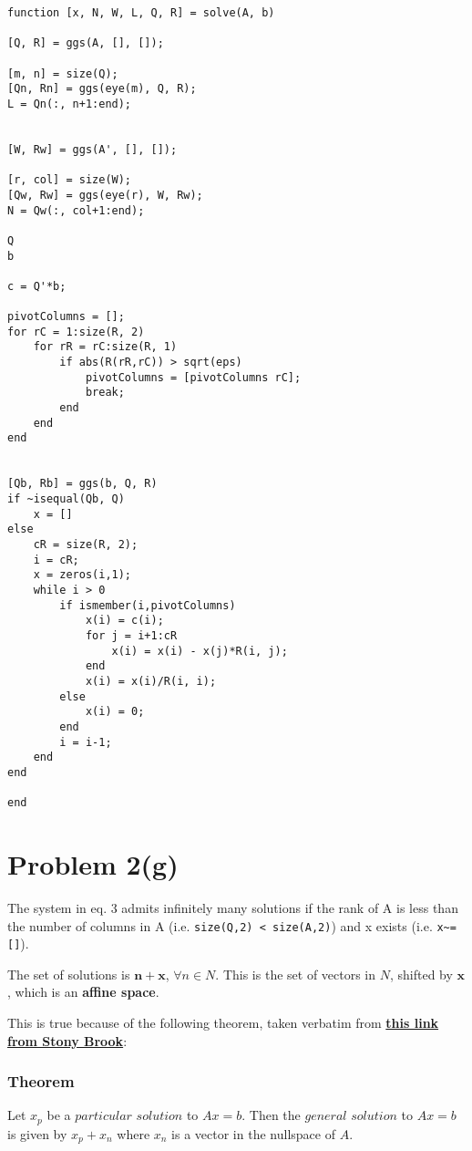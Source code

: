 \documentclass{article}
\begin{document}
\begin{verbatim}
function [x, N, W, L, Q, R] = solve(A, b)

[Q, R] = ggs(A, [], []);

[m, n] = size(Q);
[Qn, Rn] = ggs(eye(m), Q, R);
L = Qn(:, n+1:end);


[W, Rw] = ggs(A', [], []);

[r, col] = size(W);
[Qw, Rw] = ggs(eye(r), W, Rw);
N = Qw(:, col+1:end);

Q
b

c = Q'*b;

pivotColumns = [];
for rC = 1:size(R, 2)
    for rR = rC:size(R, 1)
        if abs(R(rR,rC)) > sqrt(eps)
            pivotColumns = [pivotColumns rC];
            break;
        end
    end
end


[Qb, Rb] = ggs(b, Q, R)
if ~isequal(Qb, Q)
    x = []
else
    cR = size(R, 2);
    i = cR;
    x = zeros(i,1);
    while i > 0
        if ismember(i,pivotColumns)
            x(i) = c(i);
            for j = i+1:cR
                x(i) = x(i) - x(j)*R(i, j);
            end
            x(i) = x(i)/R(i, i);
        else
            x(i) = 0;
        end
        i = i-1;
    end
end

end
\end{verbatim}

\section*{Problem 2(g)}

The system in eq. 3 admits infinitely many solutions if the rank of A is less than the number of columns in A (i.e. \verb#size(Q,2) < size(A,2)#) and x exists (i.e. \verb#x~=[]#).

The set of solutions is $ \mathbf{n} + \mathbf{x}$, $ \forall n \in N $. This is the set of vectors in $N$, shifted by $\mathbf{x}$, which is an \textbf{affine space}.

This is true because of the following theorem, taken verbatim from \textbf{\href{https://www.math.stonybrook.edu/~badger/mat211f12/solver2.pdf}{this link from Stony Brook}}:

\subsubsection*{Theorem}

Let $x_p$ be a $particular $ $solution$ to $Ax = b$. Then the $general$ $ solution$ to $Ax = b$ is given by $x_p + x_n$ where $x_n$ is a vector in the nullspace of $A$.
\end{document}
